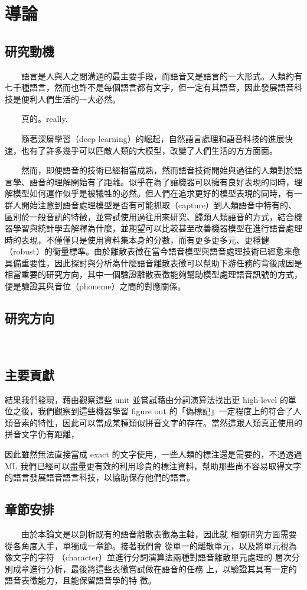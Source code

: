 
\chapter{導論}

\section{研究動機}

　　語言是人與人之間溝通的最主要手段，而語音又是語言的一大形式。人類約有七千種語言，然而也許不是每個語言都有文字，但一定有其語音，因此發展語音科技是便利人們生活的一大必然。

　　真的。really.

　　隨著深層學習（deep learning）的崛起，自然語言處理和語音科技的進展快速，也有了許多幾乎可以匹敵人類的大模型，改變了人們生活的方方面面。

　　然而，即便語音的技術已經相當成熟，然而語音技術開始與過往的人類對於語言學、語音的理解開始有了距離。似乎在為了讓機器可以擁有良好表現的同時，理解模型如何運作似乎是被犧牲的必然。但人們在追求更好的模型表現的同時，有一群人開始注意到語音處理模型是否有可能抓取（capture）到人類語音中特有的、區別於一般音訊的特徵，並嘗試使用過往用來研究、歸類人類語音的方式，結合機器學習與統計學去解釋為什麼，並期望可以比較甚至改善機器模型在進行語音處理時的表現，不僅僅只是使用資料集本身的分數，而有更多更多元、更穩健（robust）的衡量標準。由於離散表徵在當今語音模型與語音處理技術已經愈來愈具備重要性，因此探討與分析為什麼語音離散表徵可以幫助下游任務的背後成因是相當重要的研究方向，其中一個驗證離散表徵能夠幫助模型處理語音訊號的方式，便是驗證其與音位（phoneme）之間的對應關係。 


\section{研究方向}
　　
\section{主要貢獻}  %

結果我們發現，藉由觀察這些 unit 並嘗試藉由分詞演算法找出更 high-level 的單位之後，我們觀察到這些機器學習 figure out 的「偽標記」一定程度上的符合了人類音素的特性，因此可以當成某種類似拼音文字的存在。當然這跟人類真正使用的拼音文字仍有距離，

因此雖然無法直接當成 exact 的文字使用，一些人類的標注還是需要的，不過透過 ML 我們已經可以盡量更有效的利用珍貴的標注資料，幫助那些尚不容易取得文字的語言發展語音語言科技，以協助保存他們的語言。


\section{章節安排}

　　由於本論文是以剖析既有的語音離散表徵為主軸，因此就
相關研究方面需要從各角度入手，單獨成一章節。接著我們會
從單一的離散單元，以及將單元視為像文字的字符
（character）並進行分詞演算法兩種對語音離散單元處理的
層次分別成章進行分析，最後將這些表徵嘗試做在語音的任務
上，以驗證其具有一定的語音表徵能力，且能保留語音學的特
徵。
